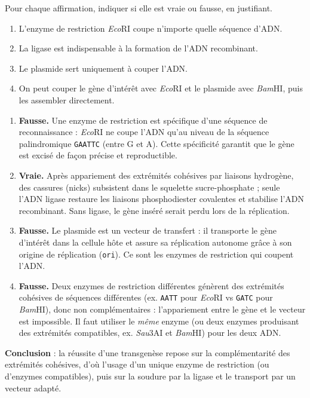 \documentclass[11pt]{article}
\newcommand{\cle}[1]{{\popxbold\color{popdark}#1}}
\begin{document}
\begin{exoresolu}
Pour chaque affirmation, indiquer si elle est vraie ou fausse, en justifiant.
\begin{enumerate}
\item L'enzyme de restriction \emph{Eco}RI coupe n'importe quelle séquence d'ADN.
\item La ligase est indispensable à la formation de l'ADN recombinant.
\item Le plasmide sert uniquement à couper l'ADN.
\item On peut couper le gène d'intérêt avec \emph{Eco}RI et le plasmide avec \emph{Bam}HI, puis les assembler directement.
\end{enumerate}
\tcblower
\begin{enumerate}
\item \textbf{Fausse.} Une enzyme de restriction est \cle{spécifique} d'une séquence de reconnaissance : \emph{Eco}RI ne coupe l'ADN qu'au niveau de la séquence palindromique \texttt{GAATTC} (entre G et A). Cette spécificité garantit que le gène est excisé de façon précise et reproductible.
\item \textbf{Vraie.} Après appariement des extrémités cohésives par liaisons hydrogène, des cassures (nicks) subsistent dans le squelette sucre-phosphate ; seule l'\cle{ADN ligase} restaure les liaisons phosphodiester covalentes et stabilise l'ADN recombinant. Sans ligase, le gène inséré serait perdu lors de la réplication.
\item \textbf{Fausse.} Le plasmide est un \cle{vecteur de transfert} : il transporte le gène d'intérêt dans la cellule hôte et assure sa réplication autonome grâce à son origine de réplication (\texttt{ori}). Ce sont les enzymes de restriction qui coupent l'ADN.
\item \textbf{Fausse.} Deux enzymes de restriction différentes génèrent des extrémités cohésives de séquences différentes (ex. \texttt{AATT} pour \emph{Eco}RI vs \texttt{GATC} pour \emph{Bam}HI), donc \cle{non complémentaires} : l'appariement entre le gène et le vecteur est impossible. Il faut utiliser le \emph{même} enzyme (ou deux enzymes produisant des extrémités compatibles, ex. \emph{Sau}3AI et \emph{Bam}HI) pour les deux ADN.
\end{enumerate}
\textbf{Conclusion} : la réussite d'une transgenèse repose sur la complémentarité des extrémités cohésives, d'où l'usage d'un unique enzyme de restriction (ou d'enzymes compatibles), puis sur la soudure par la ligase et le transport par un vecteur adapté.
\end{exoresolu}
\end{document}
